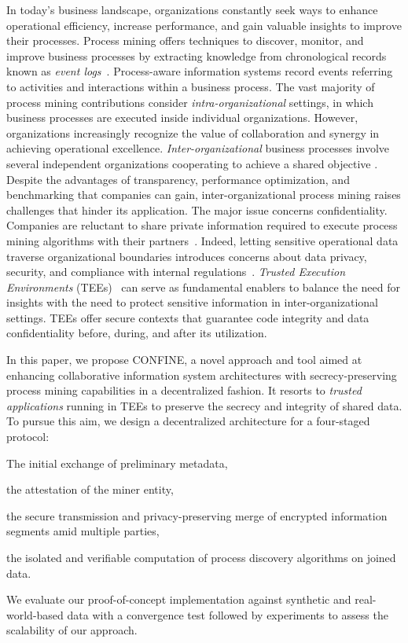 In today's business landscape, organizations constantly seek ways to enhance operational efficiency, increase performance, and gain valuable insights to improve their processes. Process mining offers techniques to discover, monitor, and improve business processes by extracting knowledge from chronological records known as \textit{event logs}~\cite{van2012process}. Process-aware information systems record events referring to activities and interactions within a business process. The vast majority of process mining contributions consider \textit{intra-organizational} settings, in which business processes are executed inside individual organizations. However, organizations increasingly recognize the value of collaboration and synergy in achieving operational excellence. \textit{Inter-organizational} business processes involve several independent organizations cooperating to achieve a shared objective \cite{van2011intra}. Despite the advantages of transparency, performance optimization, and benchmarking that companies can gain, inter-organizational process mining raises challenges that hinder its application. The major issue concerns confidentiality. Companies are reluctant to share private information required to execute process mining algorithms with their partners~\cite{liu2009challenges}. Indeed, letting sensitive operational data traverse organizational boundaries introduces concerns about data privacy, security, and compliance with internal regulations~\cite{muller2021trust}. \emph{Trusted Execution Environments} (TEEs)~\cite{DBLP:conf/trustcom/SabtAB15} can serve as fundamental enablers to balance the need for insights with the need to protect sensitive information in inter-organizational settings. TEEs offer secure contexts that guarantee code integrity and data confidentiality before, during, and after its utilization. %

In this paper, we propose CONFINE, a novel approach and tool aimed at enhancing collaborative information system architectures with secrecy-preserving process mining capabilities in a decentralized fashion. It resorts to \textit{trusted applications} running in TEEs to preserve the secrecy and integrity of shared data. To pursue this aim, we design a decentralized architecture for a four-staged protocol:
\begin{inparaenum}
	\item The initial exchange of preliminary metadata,
	\item the attestation of the miner entity,
	\item the secure transmission and privacy-preserving merge of encrypted information segments amid multiple parties,
	\item the isolated and verifiable computation of process discovery algorithms on joined data.
\end{inparaenum}
%
We evaluate our proof-of-concept implementation against synthetic and real-world-based data with a convergence test followed by experiments to assess the scalability of our approach.

